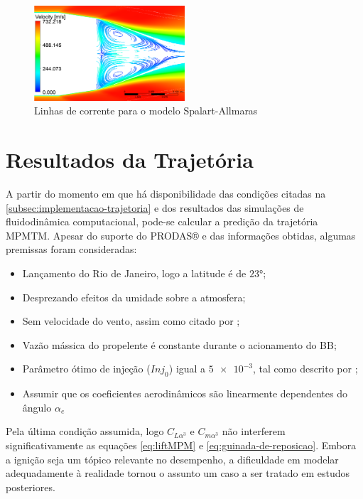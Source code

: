 \begin{figure}[!ht]
    \centering
    \includegraphics[width=0.5\textwidth]{corrente-velocidade-SPALART-2pol.png}
 	\caption{Linhas de corrente para o modelo Spalart-Allmaras}
    \label{fig:corrente-velocidade-bb-RANS}
\end{figure}

\section{Resultados da Trajetória}\label{sec:resultados-trajetoria}

A partir do momento em que há disponibilidade das condições citadas na \autoref{subsec:implementacao-trajetoria} e dos resultados das simulações de fluidodinâmica computacional, pode-se calcular a predição da trajetória MPMTM. Apesar do suporte do PRODAS® e das informações obtidas, algumas premissas foram consideradas:

\begin{itemize}
    \item Lançamento do Rio de Janeiro, logo a latitude é de $\ang{23}$;
    \item Desprezando efeitos da umidade sobre a atmosfera;
    \item Sem velocidade do vento, assim como citado por \citeauthor{Rosendo2020};
    \item Vazão mássica do propelente é constante durante o acionamento do BB;
    \item Parâmetro ótimo de injeção ($Inj_0$) igual a $\num{5e-3}$, tal como descrito por \citeauthor{DAVENAS1993329};
    \item Assumir que os coeficientes aerodinâmicos são linearmente dependentes do ângulo $\alpha_{e}$
\end{itemize}

Pela última condição assumida, logo $C_{L\alpha^{3}}$ e $C_{m\alpha^{3}}$ não interferem significativamente as equações \ref{eq:liftMPM} e \ref{eq:guinada-de-reposicao}. Embora a ignição seja um tópico relevante no desempenho, a dificuldade em modelar adequadamente à realidade tornou o assunto um caso a ser tratado em estudos posteriores.

